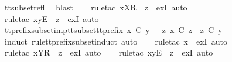 \begin{isabellebody}
\ tt{\isacharunderscore}subset{\isacharunderscore}refl\ \isamarkupfalse%
\ blast\isanewline
\ \ \isamarkupfalse%
\ {\isacharparenleft}rule{\isacharunderscore}tac\ x{\isacharequal}{\isachardoublequoteopen}{\isacharbrackleft}X{\isacharbrackright}\isactrlsub R\ {\isacharhash}\ z{\isachardoublequoteclose}\ \ exI{\isacharcomma}\ auto{\isacharparenright}\isanewline
\ \ \isamarkupfalse%
\ {\isacharparenleft}rule{\isacharunderscore}tac\ x{\isacharequal}{\isachardoublequoteopen}{\isacharbrackleft}y{\isacharbrackright}\isactrlsub E\ {\isacharhash}\ z{\isachardoublequoteclose}\ \ exI{\isacharcomma}\ auto{\isacharparenright}\isanewline
\ \ \isamarkupfalse%
%
\endisatagproof
{\isafoldproof}%
%
\isadelimproof
\isanewline
%
\endisadelimproof
\isanewline
{}\isamarkupfalse%
\ tt{\isacharunderscore}prefix{\isacharunderscore}subset{\isacharunderscore}imp{\isacharunderscore}tt{\isacharunderscore}subset{\isacharunderscore}tt{\isacharunderscore}prefix{\isacharcolon}\ {\isachardoublequoteopen}x\ {\isasymlesssim}\isactrlsub C\ y\ {\isasymLongrightarrow}\ {\isasymexists}\ z{\isachardot}\ x\ {\isasymsubseteq}\isactrlsub C\ z\ {\isasymand}\ z\ {\isasymle}\isactrlsub C\ y{\isachardoublequoteclose}\isanewline
%
\isadelimproof
\ \ %
\endisadelimproof
%
\isatagproof
{}\isamarkupfalse%
\ {\isacharparenleft}induct\ rule{\isacharcolon}tt{\isacharunderscore}prefix{\isacharunderscore}subset{\isachardot}induct{\isacharcomma}\ auto{\isacharparenright}\isanewline
\ \ \isamarkupfalse%
\ {\isacharparenleft}rule{\isacharunderscore}tac\ x{\isacharequal}{\isachardoublequoteopen}{\isacharbrackleft}{\isacharbrackright}{\isachardoublequoteclose}\ \ exI{\isacharcomma}\ auto{\isacharparenright}\isanewline
\ \ \isamarkupfalse%
\ {\isacharparenleft}rule{\isacharunderscore}tac\ x{\isacharequal}{\isachardoublequoteopen}{\isacharbrackleft}Y{\isacharbrackright}\isactrlsub R\ {\isacharhash}\ z{\isachardoublequoteclose}\ \ exI{\isacharcomma}\ auto{\isacharparenright}\isanewline
\ \ \isamarkupfalse%
\ {\isacharparenleft}rule{\isacharunderscore}tac\ x{\isacharequal}{\isachardoublequoteopen}{\isacharbrackleft}y{\isacharbrackright}\isactrlsub E\ {\isacharhash}\ z{\isachardoublequoteclose}\ \ exI{\isacharcomma}\ auto{\isacharparenright}\isanewline
\ \ \isamarkupfalse%
%
\endisatagproof
{\isafoldproof}%
%
\isadelimproof
\isanewline
%
\endisadelimproof
\isanewline
{}\isamarkupfalse%

\end{isabellebody}
